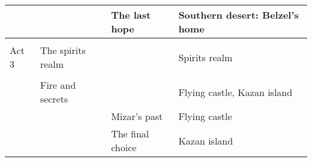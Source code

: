 \begin{table}[H]
{\begin{tabular}{|llll|}
\multicolumn{1}{|l|}{} & \multicolumn{1}{l|}{} & \multicolumn{1}{l|}{The last hope} & Southern desert: Belzel's home \\ \hline
 &  &  &  \\ \hline
\multicolumn{1}{|l|}{\cellcolor[HTML]{C0C0C0}Act 3} & \multicolumn{1}{l|}{The spirits realm} & \multicolumn{1}{l|}{} & Spirits realm \\ \hline
\multicolumn{1}{|l|}{} &  &  &  \\ \cline{2-4} 
\multicolumn{1}{|l|}{} & \multicolumn{1}{l|}{Fire and secrets} & \multicolumn{1}{l|}{} & Flying castle, Kazan island \\ \cline{2-4} 
\multicolumn{1}{|l|}{} & \multicolumn{1}{l|}{} & \multicolumn{1}{l|}{Mizar's past} & Flying castle \\ \cline{3-4} 
\multicolumn{1}{|l|}{} & \multicolumn{1}{l|}{} & \multicolumn{1}{l|}{The final choice} & Kazan island \\ \hline
\end{tabular}%
}
\end{table}